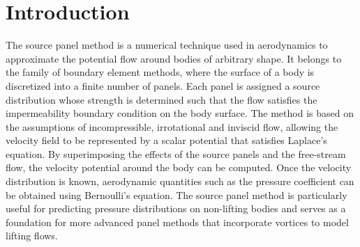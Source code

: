 \section{Introduction}
\label{sec:introduction}

The source panel method is a numerical technique used in aerodynamics to approximate the potential flow around bodies of
arbitrary shape.
It belongs to the family of boundary element methods, where the surface of a body is discretized into a finite number of
panels.
Each panel is assigned a source distribution whose strength is determined such that the flow satisfies the
impermeability boundary condition on the body surface.
The method is based on the assumptions of incompressible, irrotational and inviscid flow, allowing the velocity field to
be represented by a scalar potential that satisfies Laplace's equation.
By superimposing the effects of the source panels and the free-stream flow, the velocity potential around the body can
be computed.
Once the velocity distribution is known, aerodynamic quantities such as the pressure coefficient can be obtained using
Bernoulli's equation.
The source panel method is particularly useful for predicting pressure distributions on non-lifting bodies and serves as
a foundation for more advanced panel methods that incorporate vortices to model lifting flows.
